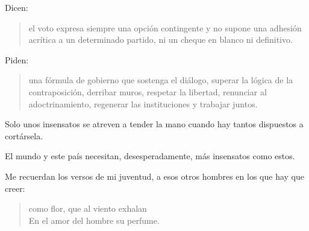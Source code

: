 \documentclass[11pt,a4paper]{article}
\begin{document}
Dicen:

\begin{quotation}
el voto expresa siempre una opción contingente y no supone una adhesión acrítica a un determinado partido, ni un cheque en blanco ni definitivo.
\end{quotation}

Piden:

\begin{quotation}
una fórmula de gobierno que sostenga el diálogo, superar la lógica de la contraposición, derribar muros, respetar la libertad, renunciar al adoctrinamiento, regenerar las instituciones y trabajar juntos.
\end{quotation}

Solo unos insensatos se atreven a tender la mano cuando hay tantos dispuestos a cortársela.

El mundo y este país necesitan, desesperadamente, más insensatos como estos.

Me recuerdan los versos de mi juventud, a esos otros hombres en los que hay que creer:

\begin{verse}
como flor, que al viento exhalan\\
En el amor del hombre su perfume.
\end{verse}
\end{document}
